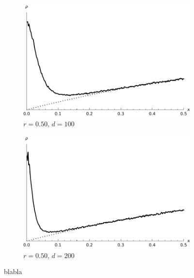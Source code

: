 \documentclass[a4paper,12pt,reqno,superscriptaddress,nofootinbib]{article}
\theoremstyle{plain}
\theoremstyle{definition}
\theoremstyle{remark}
\newcommand{\0}{^{(0)}}
\newcommand{\1}{^{(1)}}
\newcommand{\2}{^{(2)}}
\begin{document}
\begin{figure}
	\begin{subfigure}{0.48\textwidth}
		\includegraphics[width=\textwidth]{spd_r050_d100.pdf}
		\caption{$r=0.50$, $d=100$}
	\end{subfigure}\hfill
	\begin{subfigure}{0.48\textwidth}
		\includegraphics[width=\textwidth]{spd_r050_d200.pdf}
		\caption{$r=0.50$, $d=200$}
	\end{subfigure}
	\caption{blabla}\label{fig:gridplot}
\end{figure}
\end{document}
